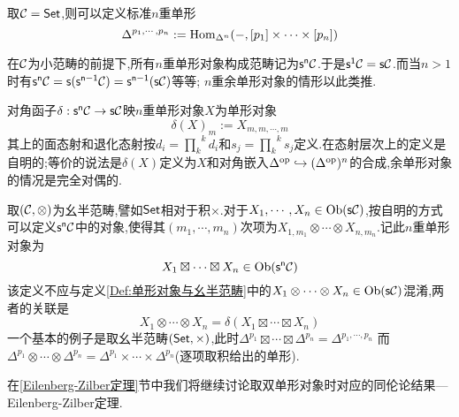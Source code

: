     \begin{example}[标准$n$重单形]
        取$\cal{C} = \mathsf{Set}$,则可以定义标准$n$重单形
        \[
        \Delta^{p_1,\cdots,p_n}:= \operatorname{Hom}_{\Delta^n}(-,[p_1]\times \cdots \times [p_n])
        \]
    \end{example}
    在$\cal{C}$为小范畴的前提下,所有$n$重单形对象构成范畴记为$\sf{s}^n\cal{C}$.于是$\sf{s}^1\cal{C} = \sf{s}\cal{C}$.而当$n >1$时有$\sf{s}^n \cal{C} = \sf{s}(\sf{s}^{n-1}\cal{C}) = \sf{s}^{n-1}(\sf{s}\cal{C})$等等; $n$重余单形对象的情形以此类推.
    \begin{definition}[对角函子]
        对角函子$\delta: \sf{s}^n\cal{C} \to \sf{s}\cal{C}$映$n$重单形对象$X$为单形对象
        \[
        \delta(X)_m := X_{m,m,\cdots,m}
        \]
        其上的面态射和退化态射按$d_i = {\prod_k} ^k d_i$和$s_j = {\prod_k} ^ks_j$定义.在态射层次上的定义是自明的;等价的说法是$\delta(X)$定义为$X$和对角嵌入$\Delta^{\operatorname{op}}\hookrightarrow (\Delta^{\operatorname{op}})^n$的合成,余单形对象的情况是完全对偶的.
    \end{definition}
    \begin{example}
        取$(\cal{C},\otimes)$为幺半范畴,譬如$\mathsf{Set}$相对于积$\times$.对于$X_1,\cdots,X_n\in \operatorname{Ob}(\sf{s}\cal{C})$,按自明的方式可以定义$\sf{s}^n\cal{C}$中的对象,使得其$(m_1,\cdots,m_n)$次项为$X_{1,m_1}\otimes \cdots \otimes X_{n,m_n}$.记此$n$重单形对象为
        \[
        X_1\boxtimes \cdots \boxtimes X_n\in \operatorname{Ob}(\sf{s}^n\cal{C})
        \]
        该定义不应与定义\ref{Def:单形对象与幺半范畴}中的$X_1\otimes \cdots \otimes X_n \in \operatorname{Ob}(\sf{s}\cal{C})$混淆,两者的关联是
        \[
        X_1\otimes \cdots \otimes X_n = \delta(X_1\boxtimes \cdots \boxtimes X_n)
        \]
        一个基本的例子是取幺半范畴$(\mathsf{Set},\times)$,此时$\Delta^{p_1}\boxtimes\cdots\boxtimes \Delta^{p_n} = \Delta^{p_1,\cdots,p_n}$ 而 $\Delta^{p_1}\otimes \cdots \otimes \Delta^{p_n} = \Delta^{p_1}\times \cdots \times \Delta^{p_n}$(逐项取积给出的单形).
    \end{example}
    在\ref{Eilenberg-Zilber定理}节中我们将继续讨论取双单形对象时对应的同伦论结果---Eilenberg-Zilber定理.
